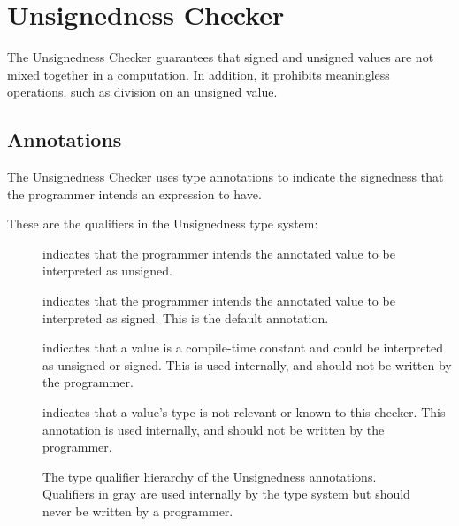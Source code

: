 \htmlhr
\chapter{Unsignedness Checker\label{unsignedness-checker}}

The Unsignedness Checker guarantees that signed and unsigned values are not mixed 
together in a computation. In addition, it prohibits meaningless operations, such 
as division on an unsigned value.

\section{Annotations\label{unsignedness-checker-annotations}}

The Unsignedness Checker uses type annotations to indicate the signedness that the programmer intends an expression to have.

These are the qualifiers in the Unsignedness type system:

\begin{description}

\item[]
    indicates that the programmer intends the annotated value to be interpreted as unsigned.

\item[]
    indicates that the programmer intends the annotated value to be interpreted
    as signed.  This is the default annotation.

\item[]
    indicates that a value is a compile-time constant and could be
    interpreted as unsigned or signed. This is used internally, and should not 
    be written by the programmer.

\item[]
    indicates that a value's type is not relevant or known to this checker. 
    This annotation is used internally, and should not be
    written by the programmer.

\end{description}

\begin{figure}
\caption{The type qualifier hierarchy of the Unsignedness annotations.
Qualifiers in gray are used internally by the type system but should never be written by a programmer.}
\label{fig-unsignedness-hierarchy}
\end{figure}

